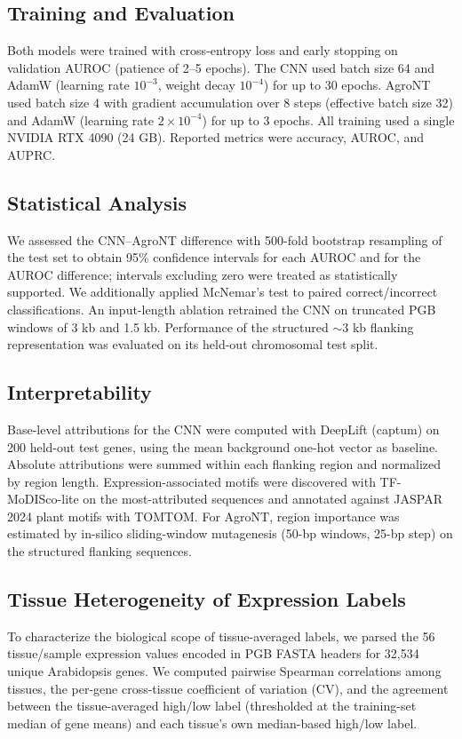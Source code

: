 \documentclass[genes,article,submit,moreauthors,pdftex]{Definitions/mdpi}
\begin{document}
\subsection{Training and Evaluation}
Both models were trained with cross-entropy loss and early stopping on validation AUROC (patience of 2--5 epochs). The CNN used batch size 64 and AdamW (learning rate $10^{-3}$, weight decay $10^{-4}$) for up to 30 epochs. AgroNT used batch size 4 with gradient accumulation over 8 steps (effective batch size 32) and AdamW (learning rate $2\times10^{-4}$) for up to 3 epochs. All training used a single NVIDIA RTX 4090 (24 GB). Reported metrics were accuracy, AUROC, and AUPRC.

\subsection{Statistical Analysis}
We assessed the CNN--AgroNT difference with 500-fold bootstrap resampling of the test set to obtain 95\% confidence intervals for each AUROC and for the AUROC difference; intervals excluding zero were treated as statistically supported. We additionally applied McNemar's test to paired correct/incorrect classifications. An input-length ablation retrained the CNN on truncated PGB windows of 3 kb and 1.5 kb. Performance of the structured $\sim$3 kb flanking representation was evaluated on its held-out chromosomal test split.

\subsection{Interpretability}
Base-level attributions for the CNN were computed with DeepLift \cite{shrikumar2017} (captum) on 200 held-out test genes, using the mean background one-hot vector as baseline. Absolute attributions were summed within each flanking region and normalized by region length. Expression-associated motifs were discovered with TF-MoDISco-lite on the most-attributed sequences and annotated against JASPAR 2024 plant motifs with TOMTOM. For AgroNT, region importance was estimated by in-silico sliding-window mutagenesis (50-bp windows, 25-bp step) on the structured flanking sequences.

\subsection{Tissue Heterogeneity of Expression Labels}
To characterize the biological scope of tissue-averaged labels, we parsed the 56 tissue/sample expression values encoded in PGB FASTA headers for 32{,}534 unique Arabidopsis genes. We computed pairwise Spearman correlations among tissues, the per-gene cross-tissue coefficient of variation (CV), and the agreement between the tissue-averaged high/low label (thresholded at the training-set median of gene means) and each tissue's own median-based high/low label.
\end{document}
